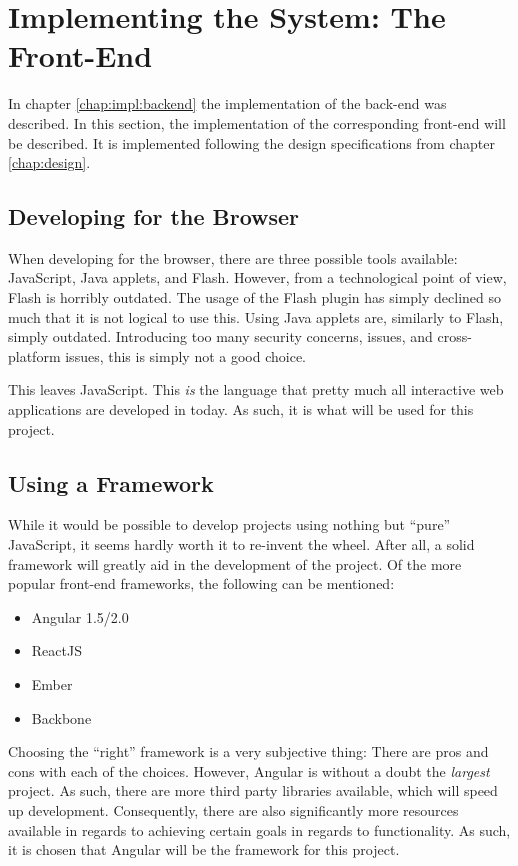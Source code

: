 \chapter{Implementing the System: The Front-End}
	In chapter \ref{chap:impl:backend} the implementation of the back-end was described. In this section, the implementation of the corresponding front-end will be described. It is implemented following the design specifications from chapter \ref{chap:design}.

	\section{Developing for the Browser}
		When developing for the browser, there are three possible tools available: JavaScript, Java applets, and Flash. However, from a technological point of view, Flash is horribly outdated. The usage of the Flash plugin has simply declined so much that it is not logical to use this. Using Java applets are, similarly to Flash, simply outdated. Introducing too many security concerns, issues, and cross-platform issues, this is simply not a good choice.

		This leaves JavaScript. This \emph{is} the language that pretty much all interactive web applications are developed in today. As such, it is what will be used for this project.


	\section{Using a Framework}
		While it would be possible to develop projects using nothing but ``pure'' JavaScript, it seems hardly worth it to re-invent the wheel. After all, a solid framework will greatly aid in the development of the project. Of the more popular front-end frameworks, the following can be mentioned:
		\begin{itemize}
			\item Angular 1.5/2.0
			\item ReactJS
			\item Ember
			\item Backbone
		\end{itemize}
		Choosing the ``right'' framework is a very subjective thing: There are pros and cons with each of the choices. However, Angular is without a doubt the \emph{largest} project. As such, there are more third party libraries available, which will speed up development. Consequently, there are also significantly more resources available in regards to achieving certain goals in regards to functionality. As such, it is chosen that Angular will be the framework for this project.


